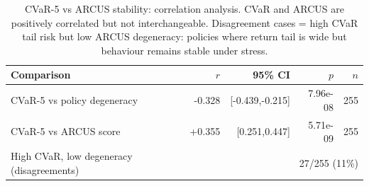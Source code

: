 \begin{table}[t]
\centering
\small
\caption{CVaR-5 vs ARCUS stability: correlation analysis. CVaR and ARCUS are positively correlated but not interchangeable. Disagreement cases = high CVaR tail risk but low ARCUS degeneracy: policies where return tail is wide but behaviour remains stable under stress.}
\label{tab:cvar_arcus}
\begin{tabular}{lrrrr}
\toprule
Comparison & $r$ & 95\% CI & $p$ & $n$ \\
\midrule
CVaR-5 vs policy degeneracy & -0.328 & [-0.439,-0.215] & 7.96e-08 & 255 \\
CVaR-5 vs ARCUS score & +0.355 & [0.251,0.447] & 5.71e-09 & 255 \\
\midrule
High CVaR, low degeneracy (disagreements) & \multicolumn{4}{r}{27/255 (11\%)} \\
\bottomrule
\end{tabular}
\end{table}